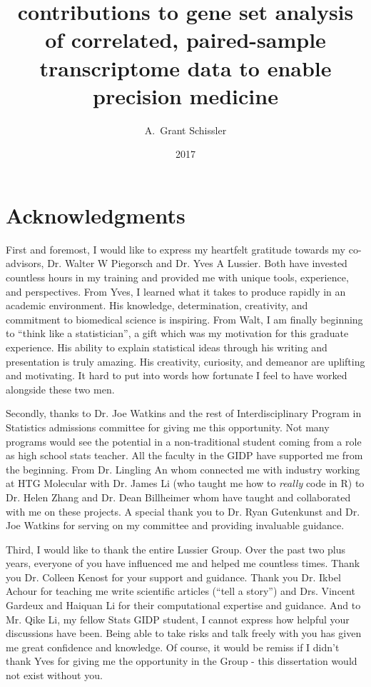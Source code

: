 \documentclass[final]{ua-thesis}
\author{A.~Grant Schissler}
\title{contributions to gene set analysis of correlated, paired-sample transcriptome data to enable precision medicine}
\date{2017}
\numberwithin{equation}{section}
\begin{document}
\maketitle

\chapter*{Acknowledgments}
First and foremost, I would like to express my heartfelt gratitude towards my co-advisors, Dr. Walter W Piegorsch and Dr. Yves A Lussier. Both have invested countless hours in my training and provided me with unique tools, experience, and perspectives. From Yves, I learned what it takes to produce rapidly in an academic environment. His knowledge, determination, creativity, and commitment to biomedical science is inspiring. From Walt, I am finally beginning to ``think like a statistician'', a gift which was my motivation for this graduate experience. His ability to explain statistical ideas through his writing and presentation is truly amazing. His creativity, curiosity, and demeanor are uplifting and motivating. It hard to put into words how fortunate I feel to have worked alongside these two men.

Secondly, thanks to Dr. Joe Watkins and the rest of Interdisciplinary Program in Statistics admissions committee for giving me this opportunity. Not many programs would see the potential in a non-traditional student coming from a role as high school stats teacher. All the faculty in the GIDP have supported me from the beginning. From Dr. Lingling An whom connected me with industry working at HTG Molecular with Dr. James Li (who taught me how to \emph{really} code in R) to Dr. Helen Zhang and Dr. Dean Billheimer whom have taught and collaborated with me on these projects. A special thank you to Dr. Ryan Gutenkunst and Dr. Joe Watkins for serving on my committee and providing invaluable guidance.

Third, I would like to thank the entire Lussier Group. Over the past two plus years, everyone of you have influenced me and helped me countless times. Thank you Dr. Colleen Kenost for your support and guidance. Thank you Dr. Ikbel Achour for teaching me write scientific articles (``tell a story'') and Drs. Vincent Gardeux and Haiquan Li for their computational expertise and guidance. And to Mr. Qike Li, my fellow Stats GIDP student, I cannot express how helpful your discussions have been. Being able to take risks and talk freely with you has given me great confidence and knowledge. Of course, it would be remiss if I didn't thank Yves for giving me the opportunity in the Group - this dissertation would not exist without you.
\end{document}
